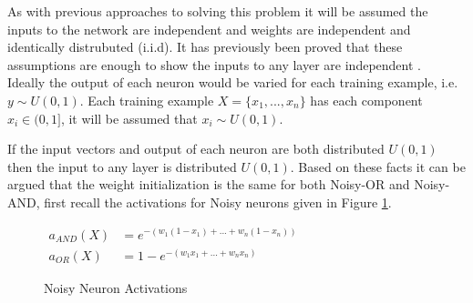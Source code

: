 As with previous approaches to solving this problem it will be assumed the inputs to the network are independent and weights are independent and identically distrubuted (i.i.d). It has previously been proved that these assumptions are enough to show the inputs to any layer are independent \cite{kumar2017weight}.\\

Ideally the output of each neuron would be varied for each training example, i.e. $y \sim U(0,1)$. Each training example $X = \{x_1, ..., x_n\}$ has each component $x_i \in (0,1]$, it will be assumed that $x_i \sim U(0,1)$. 

\noindent
\begin{minipage}[t]{0.55\textwidth}
\vspace{0px}
If the input vectors and output of each neuron are both distributed $U(0,1)$ then the input to any layer is distributed $U(0,1)$. Based on these facts it can be argued that the weight initialization is the same for both Noisy-OR and Noisy-AND, first recall the activations for Noisy neurons given in Figure \ref{fig:recall-noisy-activations}.\\
\end{minipage}
\hspace{0.05\textwidth}
\begin{minipage}[t]{0.4\textwidth}
\vspace{0px}
\begin{figure}[H]
\vspace{0px}
{\centering
$ \displaystyle
\begin{aligned}
a_{AND}(X) &= e^{-(w_1(1 - x_1) + ... + w_n(1 - x_n))}\\
a_{OR}(X) &= 1 - e^{-(w_1x_1 + ... + w_nx_n)}
\end{aligned}
$
\par}
\caption{Noisy Neuron Activations}
\label{fig:recall-noisy-activations}
\end{figure}
\end{minipage}

